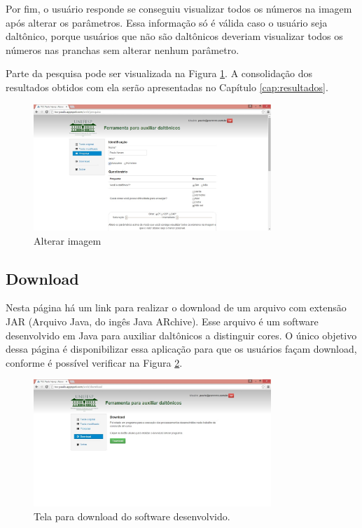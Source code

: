 \documentclass[	12pt, Times, openright, twoside, a4paper, english, brazil]{abntex2}
\begin{document}
Por fim, o usuário responde se conseguiu visualizar todos os números na imagem após alterar os parâmetros. Essa informação só é válida caso o usuário seja daltônico, porque usuários que não são daltônicos deveriam visualizar todos os números nas pranchas sem alterar nenhum parâmetro.

Parte da pesquisa pode ser visualizada na Figura \ref{fig:telaPesquisa}. A consolidação dos resultados obtidos com ela serão apresentadas no Capítulo \ref{cap:resultados}.

\begin{figure}[!htb]
\centering \includegraphics[width=0.8\textwidth]{telaPesquisa.jpg}
\caption{Alterar imagem} \label{fig:telaPesquisa}
\end{figure}


\subsection{Download}

Nesta página há um link para realizar o download de um arquivo com extensão JAR (Arquivo Java, do ingês Java ARchive). Esse arquivo é um software desenvolvido em Java para auxiliar daltônicos a distinguir cores. O único objetivo dessa página é disponibilizar essa aplicação para que os usuários façam download, conforme é possível verificar na Figura \ref{fig:figuraDownload}.

\begin{figure}[!htb]
\centering \includegraphics[width=0.8\textwidth]{telaDownload.jpg}
\caption{Tela para download do software desenvolvido.} \label{fig:figuraDownload}
\end{figure}
\end{document}
